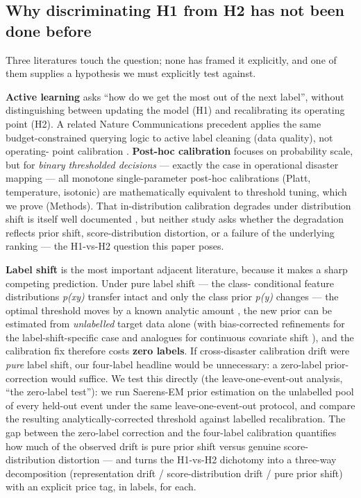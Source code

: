 \documentclass[sn-nature,lineno]{sn-jnl}
\theoremstyle{thmstyleone}
\theoremstyle{thmstyletwo}
\theoremstyle{thmstylethree}
\begin{document}
\subsection{Why discriminating H1 from H2 has not been done before}\label{why-discriminating-h1-from-h2-has-not-been-done-before}

Three literatures touch the question; none has framed it explicitly,
and one of them supplies a hypothesis we must explicitly test against.

\textbf{Active learning} \cite{sener2018coreset,gal2017dropout,settles2009active,lewisgale1994uncertainty} asks ``how do we get the most
out of the next label'', without distinguishing between updating the
model (H1) and recalibrating its operating point (H2). A related
Nature Communications precedent applies the same budget-constrained
querying logic to active label cleaning (data quality), not operating-
point calibration \cite{bernhardt2022activelabel}.
\textbf{Post-hoc
calibration} \cite{guo2017calibration,platt1999probabilistic,zadrozny2002isotonic} focuses on
probability scale, but for \emph{binary thresholded decisions} --- exactly the
case in operational disaster mapping --- all monotone single-parameter
post-hoc calibrations (Platt, temperature, isotonic) are mathematically
equivalent to threshold tuning, which we prove (Methods). That in-distribution
calibration degrades under distribution shift is itself well documented
\cite{ovadia2019trust,tomani2021posthoc}, but neither study asks whether the
degradation reflects prior shift, score-distribution distortion, or a
failure of the underlying ranking --- the H1-vs-H2 question this paper poses.

\textbf{Label shift} is the most important adjacent literature, because it
makes a sharp competing prediction. Under pure label shift --- the class-
conditional feature distributions \emph{p(x\textbar y)} transfer intact and only the
class prior \emph{p(y)} changes --- the optimal threshold moves by a known
analytic amount \cite{elkan2001foundations}, the new prior can be estimated from
\emph{unlabelled} target data alone \cite{saerens2002adjusting,lipton2018detecting,garg2020unified}
(with bias-corrected refinements for the label-shift-specific case
\cite{alexandari2020biascorrected} and analogues for continuous covariate
shift \cite{wang2020transcal}), and the calibration fix therefore costs
\textbf{zero labels}. If cross-disaster calibration drift were \emph{pure} label
shift, our four-label headline would be unnecessary: a zero-label
prior-correction would suffice. We test this directly (the leave-one-event-out analysis, ``the
zero-label test''): we run Saerens-EM prior estimation on the unlabelled
pool of every held-out event under the same leave-one-event-out
protocol, and compare the resulting analytically-corrected threshold
against labelled recalibration. The gap between the zero-label
correction and the four-label calibration quantifies how much of the
observed drift is pure prior shift versus genuine score-distribution
distortion --- and turns the H1-vs-H2 dichotomy into a three-way
decomposition (representation drift / score-distribution drift / pure
prior shift) with an explicit price tag, in labels, for each.
\end{document}
